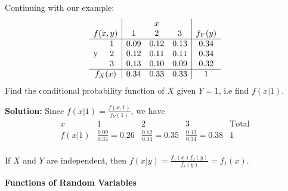 \begin{example}
    Continuing with our example:
    \[
        \begin{array}{cc|ccc|c}
            & & \multicolumn{3}{c|}{x} & \\
            \multicolumn{2}{c|}{f(x,y)} & 1 & 2 & 3 & f_Y(y) \\
            \hline
            \multirow{3}{*}{y} 
              & 1 & 0.09 & 0.12 & 0.13 & 0.34 \\
              & 2 & 0.12 & 0.11 & 0.11 & 0.34 \\
              & 3 & 0.13 & 0.10 & 0.09 & 0.32 \\
            \hline
            \multicolumn{2}{c|}{f_X(x)} & 0.34 & 0.33 & 0.33 & 1
        \end{array}
    \]
    Find the conditional probability function of $X$ given $Y = 1$, i.e find $f(x|1)$.

    \textbf{Solution:} Since $f(x|1) = \frac{f(x,1)}{f_Y(1)}$, we have \vspace{-2mm}
    \[
        \begin{array}{c|ccc|c}
            x & 1 & 2 & 3 & \text{Total} \\
            \hline
            f(x|1) & \frac{0.09}{0.34} = 0.26 & \frac{0.12}{0.34} = 0.35 & \frac{0.13}{0.34} = 0.38 & 1 \\
        \end{array}
    \]  
\end{example}

\begin{remark}
    If $X$ and $Y$ are independent, then $f(x|y) = \frac{f_1(x) f_2(y)}{f_2(y)} = f_1(x)$.
\end{remark}

\pagebreak

\textbf{Functions of Random Variables}

